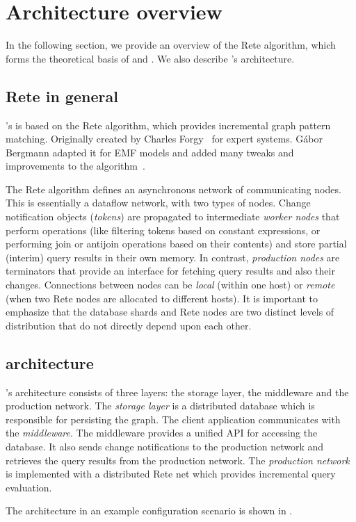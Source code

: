 \section{Architecture overview}
\label{sec:architecture}

In the following section, we provide an overview of the Rete algorithm, which forms the theoretical basis of \eiq{} and \iqd{}. We also describe \iqd{}'s architecture.

\subsection{Rete in general}
\label{subsec:rete}

\iqd{}'s is based on the Rete algorithm, which provides incremental graph pattern matching. Originally created by Charles Forgy~\cite{Forgy} for expert systems. Gábor Bergmann adapted it for EMF models and added many tweaks and improvements to the algorithm~\cite{BergmannRete}.

The Rete algorithm defines an asynchronous network of communicating nodes. This is essentially a dataflow network, with two types of nodes. Change notification objects (\emph{tokens}) are propagated to intermediate \emph{worker nodes} that perform operations (like filtering tokens based on constant expressions, or performing join or antijoin operations based on their contents) and store partial (interim) query results in their own memory. In contrast, \emph{production nodes} are terminators that provide an interface for fetching query results and also their changes. Connections between nodes can be \emph{local} (within one host) or \emph{remote} (when two Rete nodes are allocated to different hosts). It is important to emphasize that the database shards and Rete nodes are two distinct levels of distribution that do not directly depend upon each other.

\subsection{\iqd{} architecture}

\iqd{}'s architecture consists of three layers: the storage layer, the middleware and the production network. 
The \emph{storage layer} is a distributed database which is responsible for persisting the graph. 
The client application communicates with the \emph{middleware}. The middleware provides a unified API for accessing the database. It also sends change notifications to the production network and retrieves the query results from the production network. 
The \emph{production network} is implemented with a distributed Rete net which provides incremental query evaluation. 


The \iqd{} architecture in an example configuration scenario is shown in .
